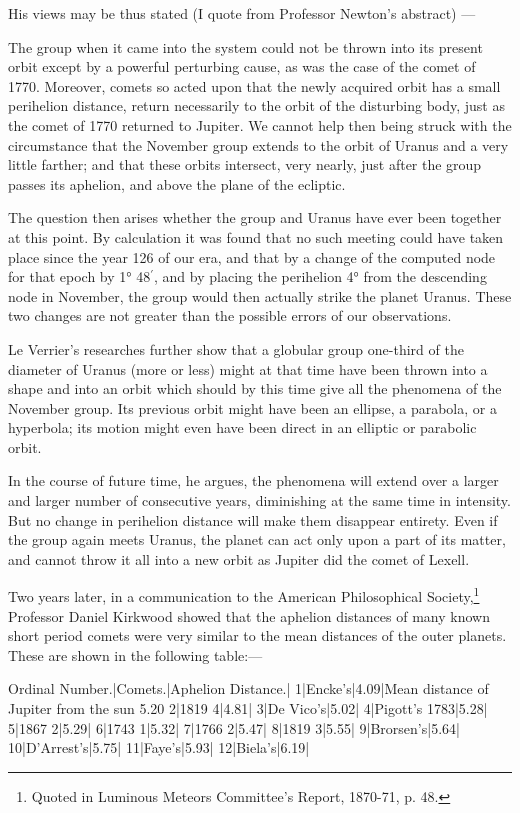 \documentclass[a4paper, 12pt, oneside, polutonikogreek, english]{article}
\begin{document}
His views may be thus stated (I quote from Professor Newton's abstract) ---

The group when it came into the system could not be thrown into its present orbit except by a powerful perturbing cause, as was the case of the comet of 1770. Moreover, comets so acted upon that the newly acquired orbit has a small perihelion distance, return necessarily to the orbit of the disturbing body, just as the comet of 1770 returned to Jupiter. We cannot help then being struck with the circumstance that the November group extends to the orbit of Uranus and a very little farther; and that these orbits intersect, very nearly, just after the group passes its aphelion, and above the plane of the ecliptic.

The question then arises whether the group and Uranus have ever been together at this point. By calculation it was found that no such meeting could have taken place since the year 126 of our era, and that by a change of the computed node for that epoch by 1° 48$^{\prime}$, and by placing the perihelion 4° from the descending node in November, the group would then actually strike the planet Uranus. These two changes are not greater than the possible errors of our observations.

Le Verrier's researches further show that a globular group one-third of the diameter of Uranus (more or less) might at that time have been thrown into a shape and into an orbit which should by this time give all the phenomena of the November group. Its previous orbit might have been an ellipse, a parabola, or a hyperbola; its motion might even have been direct in an elliptic or parabolic orbit.

In the course of future time, he argues, the phenomena will extend over a larger and larger number of consecutive years, diminishing at the same time in intensity. But no change in perihelion distance will make them disappear entirety. Even if the group again meets Uranus, the planet can act only upon a part of its matter, and cannot throw it all into a new orbit as Jupiter did the comet of Lexell.

Two years later, in a communication to the American Philosophical Society,\footnote{Quoted in Luminous Meteors Committee's Report, 1870-71, p. 48.} Professor Daniel Kirkwood showed that the aphelion distances of many known short period comets were very similar to the mean distances of the outer planets. These are shown in the following table:---

Ordinal Number.|Comets.|Aphelion Distance.| 
1|Encke's|4.09|Mean distance of Jupiter from the sun 5.20 
2|1819 4|4.81| 
3|De Vico's|5.02| 
4|Pigott's 1783|5.28| 
5|1867 2|5.29| 
6|1743 1|5.32| 
7|1766 2|5.47| 
8|1819 3|5.55| 
9|Brorsen's|5.64| 
10|D'Arrest's|5.75| 
11|Faye's|5.93| 
12|Biela's|6.19| 
 
\end{document}
